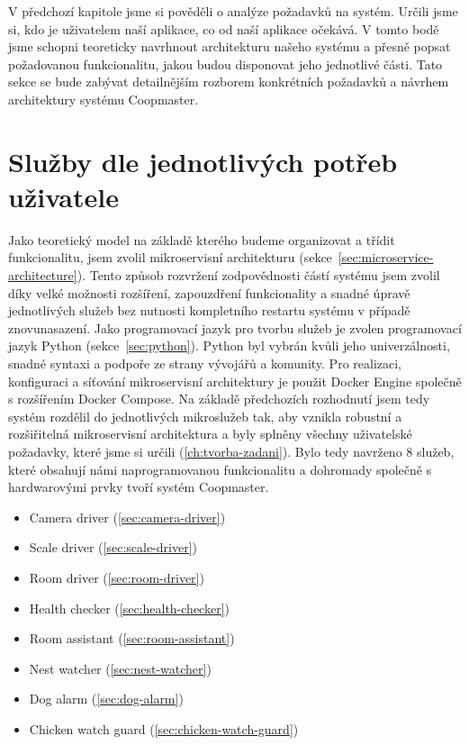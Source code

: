 V předchozí kapitole jsme si pověděli o analýze požadavků na systém.
Určili jsme si, kdo je uživatelem naší aplikace, co od naší aplikace očekává.
V tomto bodě jsme schopni teoreticky navrhnout architekturu našeho systému a přesně popsat požadovanou funkcionalitu, jakou budou disponovat jeho jednotlivé části.
Tato sekce se bude zabývat detailnějším rozborem konkrétních požadavků a návrhem architektury systému Coopmaster.

\clearpage
\section{Služby dle jednotlivých potřeb uživatele}\label{sec:microservices}
Jako teoretický model na základě kterého budeme organizovat a třídit funkcionalitu, jsem zvolil mikroservisní architekturu (sekce~\ref{sec:microservice-architecture}).
Tento způsob rozvržení zodpovědnosti částí systému jsem zvolil díky velké možnosti rozšíření, zapouzdření funkcionality a snadné úpravě jednotlivých služeb bez nutnosti kompletního restartu systému v případě znovunasazení.\newline
Jako programovací jazyk pro tvorbu služeb je zvolen programovací jazyk Python (sekce~\ref{sec:python}).
Python byl vybrán kvůli jeho univerzálnosti, snadné syntaxi a podpoře ze strany vývojářů a komunity.\newline
Pro realizaci, konfiguraci a síťování mikroservisní architektury je použit Docker Engine společně s rozšířením Docker Compose.\newline
Na základě předchozích rozhodnutí jsem tedy systém rozdělil do jednotlivých mikroslužeb tak, aby vznikla robustní a rozšiřitelná mikroservisní architektura a byly splněny všechny uživatelské požadavky, které jsme si určili (\ref{ch:tvorba-zadani}).\newline
Bylo tedy navrženo 8 služeb, které obsahují námi naprogramovanou funkcionalitu a dohromady společně s hardwarovými prvky tvoří systém Coopmaster.
\begin{itemize}
    \item Camera driver (\ref{sec:camera-driver})
    \item Scale driver (\ref{sec:scale-driver})
    \item Room driver (\ref{sec:room-driver})
    \item Health checker (\ref{sec:health-checker})
    \item Room assistant (\ref{sec:room-assistant})
    \item Nest watcher (\ref{sec:nest-watcher})
    \item Dog alarm (\ref{sec:dog-alarm})
    \item Chicken watch guard (\ref{sec:chicken-watch-guard})
\end{itemize}

